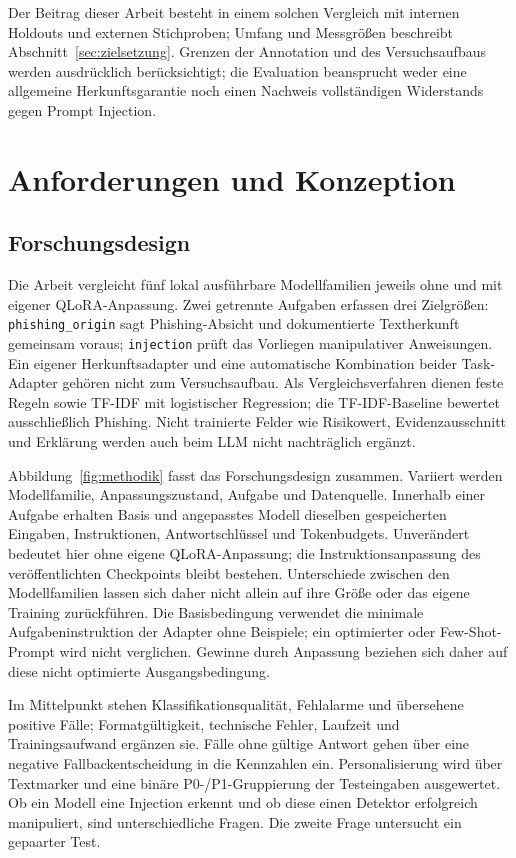 \documentclass[12pt,twoside=false,a4paper,parskip]{scrbook}
\begin{document}
Der Beitrag dieser Arbeit besteht in einem solchen Vergleich mit internen Holdouts und externen Stichproben; Umfang und Messgrößen beschreibt Abschnitt~\ref{sec:zielsetzung}. Grenzen der Annotation und des Versuchsaufbaus werden ausdrücklich berücksichtigt; die Evaluation beansprucht weder eine allgemeine Herkunftsgarantie noch einen Nachweis vollständigen Widerstands gegen Prompt Injection.

\chapter{Anforderungen und Konzeption}\label{ch:konzeption}

\section{Forschungsdesign}\label{sec:forschungsdesign}

Die Arbeit vergleicht fünf lokal ausführbare Modellfamilien jeweils ohne und mit eigener QLoRA-Anpassung. Zwei getrennte Aufgaben erfassen drei Zielgrößen: \texttt{phishing\_origin} sagt Phishing-Absicht und dokumentierte Textherkunft gemeinsam voraus; \texttt{injection} prüft das Vorliegen manipulativer Anweisungen. Ein eigener Herkunftsadapter und eine automatische Kombination beider Task-Adapter gehören nicht zum Versuchsaufbau. Als Vergleichsverfahren dienen feste Regeln sowie TF-IDF mit logistischer Regression; die TF-IDF-Baseline bewertet ausschließlich Phishing. Nicht trainierte Felder wie Risikowert, Evidenzausschnitt und Erklärung werden auch beim LLM nicht nachträglich ergänzt.

Abbildung~\ref{fig:methodik} fasst das Forschungsdesign zusammen. Variiert werden Modellfamilie, Anpassungszustand, Aufgabe und Datenquelle. Innerhalb einer Aufgabe erhalten Basis und angepasstes Modell dieselben gespeicherten Eingaben, Instruktionen, Antwortschlüssel und Tokenbudgets. Unverändert bedeutet hier ohne eigene QLoRA-Anpassung; die Instruktionsanpassung des veröffentlichten Checkpoints bleibt bestehen. Unterschiede zwischen den Modellfamilien lassen sich daher nicht allein auf ihre Größe oder das eigene Training zurückführen. Die Basisbedingung verwendet die minimale Aufgabeninstruktion der Adapter ohne Beispiele; ein optimierter oder Few-Shot-Prompt wird nicht verglichen. Gewinne durch Anpassung beziehen sich daher auf diese nicht optimierte Ausgangsbedingung.

Im Mittelpunkt stehen Klassifikationsqualität, Fehlalarme und übersehene positive Fälle; Formatgültigkeit, technische Fehler, Laufzeit und Trainingsaufwand ergänzen sie. Fälle ohne gültige Antwort gehen über eine negative Fallbackentscheidung in die Kennzahlen ein. Personalisierung wird über Textmarker und eine binäre P0-/P1-Gruppierung der Testeingaben ausgewertet. Ob ein Modell eine Injection erkennt und ob diese einen Detektor erfolgreich manipuliert, sind unterschiedliche Fragen. Die zweite Frage untersucht ein gepaarter Test.
\end{document}
